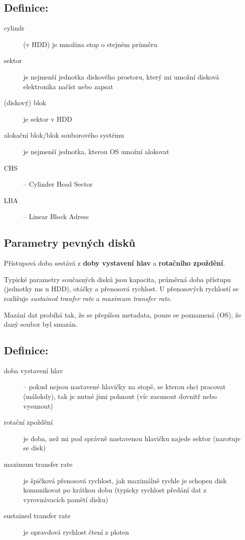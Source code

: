 \documentclass[a4paper, 11pt]{article}
\begin{document}
\subsection*{Definice:}
\begin{description}
\item[cylindr] (v HDD) je množina stop o stejném průměru
\item[sektor] je nejmenší jednotka diskového prostoru, který mi umožní disková elektronika načíst nebo zapsat
\item[(diskový) blok] je sektor v HDD
\item[alokační blok/blok souborového systému] je nejmenší jednotka, kterou OS umožní alokovat
\item[CHS] -- Cylinder Head Sector
\item[LBA] -- Linear Block Adress
\end{description}

\subsection{Parametry pevných disků}
Přístupová doba sestává z \textbf{doby vystavení hlav} a \textbf{rotačního zpoždění}.

 Typické parametry současných disků jsou kapacita, průměrná doba přístupu (jednotky ms u HDD), otáčky a přenosová rychlost. U přenosových rychlostí se rozlišuje \textit{sustained tranfer rate} a \textit{maximum transfer rate}.
 
Mazání dat probíhá tak, že se přepíšou metadata, pouze se poznamená (OS), že daný soubor byl smazán.
 
\subsection*{Definice:}
\begin{description}
\item[doba vystavení hlav] -- pokud nejsou nastavené hlavičky na stopě, se kterou chci pracovat (málokdy), tak je nutné jimi pohnout (víc zasunout dovnitř nebo vysunout)

\item[rotační zpoždění] je doba, než mi pod správně nastavenou hlavičku najede sektor (narotuje se disk)

\item[maximum transfer rate] je špičková přenosová rychlost, jak maximálně rychle je schopen disk komunikovat po krátkou dobu (typicky rychlost předání dat z vyrovnávacích pamětí disku)

\item[sustained transfer rate] je opravdová rychlost čtení z ploten
\end{description}
\end{document}

